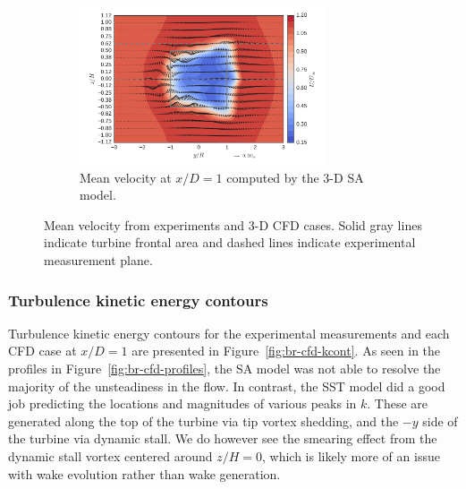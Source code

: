 \documentclass[aip,graphicx]{revtex4-1}
\begin{document}
\begin{figure}
    \begin{subfigure}[b]{\textwidth}
        \centering

        \includegraphics[clip, trim=0 0.2in 0 0.15in,
        width=0.8\textwidth]{meancontquiv_SpalartAllmaras}

        \caption{Mean velocity at $x/D=1$ computed by the 3-D SA model.}

        \label{fig:meancontquiv-SA}
    \end{subfigure}

    \caption{Mean velocity from experiments and 3-D CFD cases. Solid gray lines
        indicate turbine frontal area and dashed lines indicate experimental
        measurement plane.}

    \label{fig:br-cfd-mean-velocity}
\end{figure}


\subsubsection{Turbulence kinetic energy contours}

Turbulence kinetic energy contours for the experimental measurements and each
CFD case at $x/D=1$ are presented in Figure~\ref{fig:br-cfd-kcont}. As seen in
the profiles in Figure~\ref{fig:br-cfd-profiles}, the SA model was not able to
resolve the majority of the unsteadiness in the flow. In contrast, the SST model
did a good job predicting the locations and magnitudes of various peaks in $k$.
These are generated along the top of the turbine via tip vortex shedding, and
the $-y$ side of the turbine via dynamic stall. We do however see the smearing
effect from the dynamic stall vortex centered around $z/H=0$, which is likely
more of an issue with wake evolution rather than wake generation.
\end{document}
